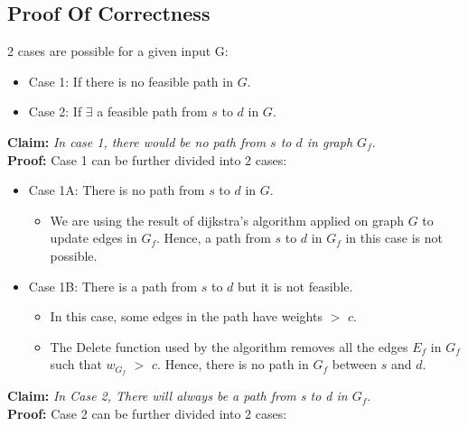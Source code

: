 \documentclass[pdftex,a4paper,12pt]{report}
\begin{document}
\subsection{Proof Of Correctness}
2 cases are possible for a given input G:
\begin{itemize}
\item Case 1: If there is no feasible path in $G$.
\item Case 2: If $\exists$ a feasible path from $s$ to $d$ in $G$.
\end{itemize}
\textbf{Claim:} \emph{In case 1, there would be no path from $s$ to $d$ in graph $G_{f}$}.\\
\textbf{Proof:} Case 1 can be further divided into 2 cases:
\begin{itemize}
\item Case 1A: There is no path from $s$ to $d$ in $G$.
    \begin{itemize}
    \item We are using the result of dijkstra's algorithm applied on graph $G$ to update edges in $G_{f}$. Hence, a path from $s$ to $d$ in $G_{f}$ in this case is not possible. 
    \end{itemize}
\item Case 1B: There is a path from $s$ to $d$ but it is not feasible.
    \begin{itemize}
    \item In this case, some edges in the path have weights $>$ $c$.
    \item The Delete function used by the algorithm removes all the edges $E_{f}$ in $G_{f}$ such that $w_{G_f}$ $>$ $c$. Hence, there is no path in $G_{f}$ between $s$ and $d$.
    \end{itemize}
\end{itemize}
\textbf{Claim:} \emph{In Case 2, There will always be a path from s to d in $G_{f}$}.\\
\textbf{Proof:} Case 2 can be further divided into 2 cases:
\end{document}
